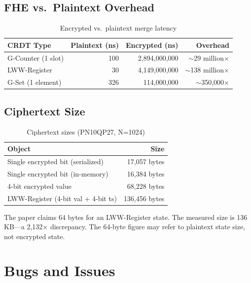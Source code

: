 \documentclass{../shared/luxfhe}
\begin{document}
\subsection{FHE vs.\ Plaintext Overhead}

\begin{table}[h]
\centering
\caption{Encrypted vs.\ plaintext merge latency}
\label{tab:overhead}
\begin{tabular}{lrrr}
\toprule
CRDT Type & Plaintext (ns) & Encrypted (ns) & Overhead \\
\midrule
G-Counter (1 slot) & 100       & 2,894,000,000     & $\sim$29 million$\times$ \\
LWW-Register       & 30        & 4,149,000,000     & $\sim$138 million$\times$ \\
G-Set (1 element)  & 326       & 114,000,000       & $\sim$350,000$\times$ \\
\bottomrule
\end{tabular}
\end{table}

\subsection{Ciphertext Size}

\begin{table}[h]
\centering
\caption{Ciphertext sizes (PN10QP27, N=1024)}
\label{tab:sizes}
\begin{tabular}{lr}
\toprule
Object & Size \\
\midrule
Single encrypted bit (serialized) & 17,057 bytes \\
Single encrypted bit (in-memory)  & 16,384 bytes \\
4-bit encrypted value             & 68,228 bytes \\
LWW-Register (4-bit val + 4-bit ts) & 136,456 bytes \\
\bottomrule
\end{tabular}
\end{table}

The paper claims 64 bytes for an LWW-Register state.  The measured
size is 136 KB---a 2,132$\times$ discrepancy.  The 64-byte figure
may refer to plaintext state size, not encrypted state.

\section{Bugs and Issues}
\end{document}
